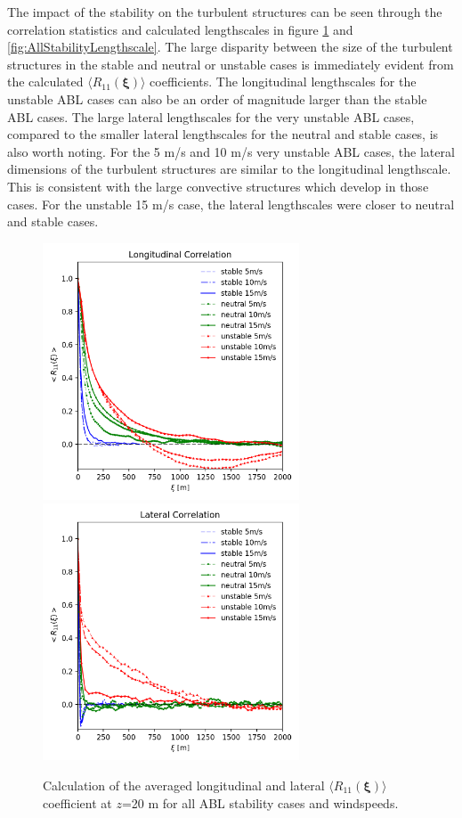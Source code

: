 The impact of the stability on the turbulent structures can be seen
through the correlation statistics and calculated lengthscales in
figure \ref{fig:AllStabilityRij} and
\ref{fig:AllStabilityLengthscale}.  The large disparity between the
size of the turbulent structures in the stable and neutral or unstable
cases is immediately evident from the calculated $\langle
R_{11}(\boldsymbol{\xi})\rangle$ coefficients.  The longitudinal
lengthscales for the unstable ABL cases can also be an order of
magnitude larger than the stable ABL cases.  The large lateral
lengthscales for the very unstable ABL cases, compared to the smaller lateral
lengthscales for the neutral and stable cases, is also worth noting.
For the 5 m/s and 10 m/s very unstable ABL cases, the lateral
dimensions of the turbulent structures are similar to the longitudinal
lengthscale.  This is consistent with the large convective structures
which develop in those cases.  For the unstable 15 m/s case, the
lateral lengthscales were closer to neutral and stable cases.

\begin{figure}[hbt!]
  \centering
  \includegraphics[width=3in]{figures/AllStability_Rij_Longitudinal.png}
  \includegraphics[width=3in]{figures/AllStability_Rij_Lateral.png}
  \caption{ \label{fig:AllStabilityRij} Calculation of the averaged
    longitudinal and lateral $\langle R_{11}(\boldsymbol{\xi})\rangle$
    coefficient at $z$=20 m for all ABL stability cases and windspeeds.}
\end{figure}

